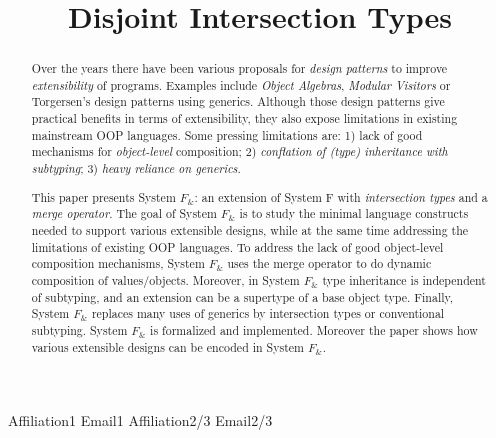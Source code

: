 \documentclass[nocopyrightspace,preprint,times,9pt]{sigplanconf}
\newcommand{\name}{{\bf $F_{\&}$}\xspace}
\begin{document}
\setlength{\pdfpageheight}{\paperheight}
\setlength{\pdfpagewidth}{\paperwidth}


\preprintfooter{\name}                        %

\title{Disjoint Intersection Types}

           {Affiliation1}
           {Email1}
           {Affiliation2/3}
           {Email2/3}

\maketitle

\begin{abstract}

  Over the years there have been various proposals for \emph{design
    patterns} to improve \emph{extensibility} of programs.
  Examples include \emph{Object Algebras}, \emph{Modular Visitors} or
  Torgersen's design patterns using generics.
  Although those design patterns give practical
  benefits in terms of extensibility, they also expose limitations in
  existing mainstream OOP languages. Some pressing
  limitations are: 1) lack of good mechanisms for
  \emph{object-level} composition; 2) \emph{conflation of
    (type) inheritance with subtyping}; 3) \emph{heavy reliance on generics}.

  This paper presents System \name: an extension of System F with
  \emph{intersection types} and a \emph{merge operator}.  The goal of System \name
  is to study the minimal language constructs needed to support
  various extensible designs, while at the same time addressing the
  limitations of existing OOP languages. To address the lack of good
  object-level composition mechanisms, System \name uses the merge
  operator to do dynamic composition of values/objects. Moreover, in
  System \name type inheritance is independent of subtyping, and an
  extension can be a supertype of a base object type.  Finally, System
  \name replaces many uses of generics by intersection types or
  conventional subtyping. System \name is formalized and
  implemented. Moreover the paper shows how various extensible designs
  can be encoded in System \name.

\end{abstract}
\end{document}
